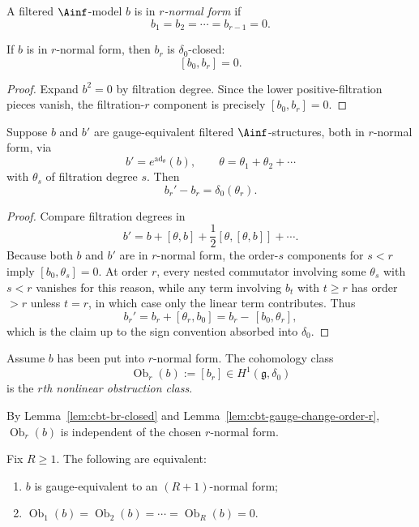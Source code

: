 \begin{definition}
A filtered $\Ainf$-model $b$ is in \emph{$r$-normal form} if
\[
b_1=b_2=\cdots=b_{r-1}=0.
\]
\end{definition}

\begin{lemma}
If $b$ is in $r$-normal form, then $b_r$ is $\delta_0$-closed:
\[
[b_0,b_r]=0.
\]
\end{lemma}

\begin{proof}
Expand $b^2=0$ by filtration degree. Since the lower positive-filtration pieces vanish, the filtration-$r$ component is precisely $[b_0,b_r]=0$.
\end{proof}

\begin{lemma}
Suppose $b$ and $b'$ are gauge-equivalent filtered $\Ainf$-structures, both in $r$-normal form, via
\[
b'=e^{\operatorname{ad}_\theta}(b),
\qquad
\theta=\theta_1+\theta_2+\cdots
\]
with $\theta_s$ of filtration degree $s$. Then
\[
b_r'-b_r=\delta_0(\theta_r).
\]
\end{lemma}

\begin{proof}
Compare filtration degrees in
\[
b'=b+[\theta,b]+\frac12[\theta,[\theta,b]]+\cdots.
\]
Because both $b$ and $b'$ are in $r$-normal form, the order-$s$ components for $s<r$ imply $[b_0,\theta_s]=0$. At order $r$, every nested commutator involving some $\theta_s$ with $s<r$ vanishes for this reason, while any term involving $b_t$ with $t\ge r$ has order $>r$ unless $t=r$, in which case only the linear term contributes. Thus
\[
b_r'=b_r+[\theta_r,b_0]=b_r-\,[b_0,\theta_r],
\]
which is the claim up to the sign convention absorbed into $\delta_0$.
\end{proof}

\begin{definition}
Assume $b$ has been put into $r$-normal form. The cohomology class
\[
\operatorname{Ob}_r(b):=[b_r]\in H^1(\mathfrak g,\delta_0)
\]
is the \emph{$r$th nonlinear obstruction class}.
\end{definition}

By Lemma~\ref{lem:cbt-br-closed} and Lemma~\ref{lem:cbt-gauge-change-order-r}, $\operatorname{Ob}_r(b)$ is independent of the chosen $r$-normal form.

\begin{theorem}
Fix $R\ge1$. The following are equivalent:
\begin{enumerate}[label=\textup{(\roman*)},leftmargin=2em]
\item $b$ is gauge-equivalent to an $(R+1)$-normal form;
\item $\operatorname{Ob}_1(b)=\operatorname{Ob}_2(b)=\cdots=\operatorname{Ob}_R(b)=0$.
\end{enumerate}
\end{theorem}

